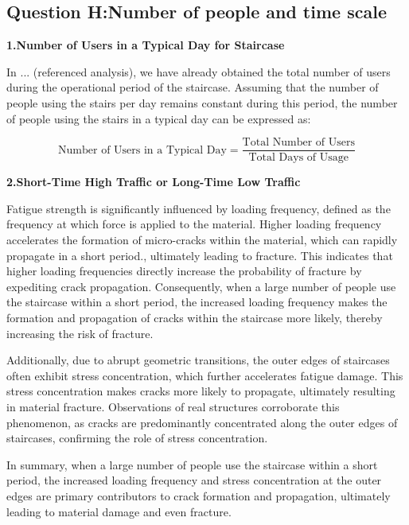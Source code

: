 \documentclass{mcmthesis}
\begin{document}
\subsection{Question H:Number of people and time scale}


\textbf{1.Number of Users in a Typical Day for Staircase }


In ... (referenced analysis), we have already obtained the total number of users during the operational period of the staircase. Assuming that the number of people using the stairs per day remains constant during this period, the number of people using the stairs in a typical day can be expressed as:

\[\text{Number of Users in a Typical Day} = \frac{\text{Total Number of Users}}{\text{Total Days of Usage}}\]

\textbf{2.Short-Time High Traffic or Long-Time Low Traffic}


Fatigue strength is significantly influenced by loading frequency, defined as the frequency at which force is applied to the
material\cite{Yokobori1976}\cite{Takezono1980}\cite{HeimbachHeimbach+1970+377+380}. Higher loading frequency accelerates the formation of micro-cracks within the material, which can rapidly propagate in a short
period\cite{ SJESAC88A958454EEE1CD4ED092FB8A0E8F8}.\cite{ SJESF46245B4D88236414B6977C781CEC048}, ultimately leading to fracture. This indicates that higher loading frequencies directly increase the probability of fracture by expediting crack propagation. Consequently, when a large number of people use the staircase within a short period, the increased loading frequency makes the formation and propagation of cracks within the staircase more likely, thereby increasing the risk of fracture.

Additionally, due to abrupt geometric transitions, the outer edges of staircases often exhibit stress concentration, which further accelerates fatigue damage. This stress concentration makes cracks more likely to propagate, ultimately resulting in material fracture. Observations of real structures corroborate this phenomenon, as cracks are predominantly concentrated along the outer edges of staircases, confirming the role of stress concentration.

In summary, when a large number of people use the staircase within a short period, the increased loading frequency and stress concentration at the outer edges are primary contributors to crack formation and propagation, ultimately leading to material damage and even fracture.
\end{document}
